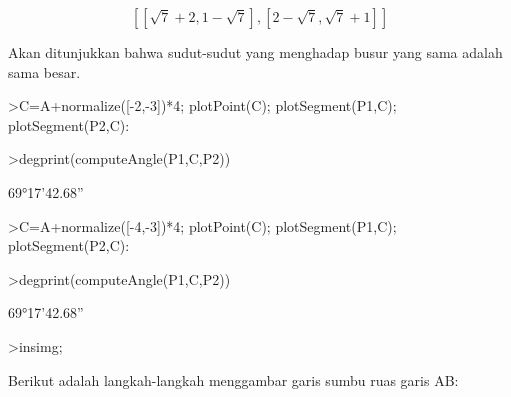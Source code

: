 \documentclass[12pt,Times new roman,letterpaper]{book}
\begin{document}
\begin{eulernootebook}
\begin{eulercomment}
\begin{eulercomment}
\begin{eulernootebook}
\begin{eulercomment}
\begin{eulercomment}
\begin{eulercomment}
\begin{eulercomment}
\begin{eulercomment}
\begin{eulercomment}
\begin{eulernotebook}
\begin{eulercomment}
\begin{euleroutput}
\end{euleroutput}
\begin{eulerformula}
\[
\left[ \left[ \sqrt{7}+2 , 1-\sqrt{7} \right]  , \left[ 2-\sqrt{7}
  , \sqrt{7}+1 \right]  \right] 
\]
\end{eulerformula}
\begin{eulercomment}
Akan ditunjukkan bahwa sudut-sudut yang menghadap busur yang sama
adalah sama besar.
\end{eulercomment}
\begin{eulerprompt}
>C=A+normalize([-2,-3])*4; plotPoint(C); plotSegment(P1,C); plotSegment(P2,C):
\end{eulerprompt}
\begin{eulerprompt}
>degprint(computeAngle(P1,C,P2))
\end{eulerprompt}
\begin{euleroutput}
  69°17'42.68''
\end{euleroutput}
\begin{eulerprompt}
>C=A+normalize([-4,-3])*4; plotPoint(C); plotSegment(P1,C); plotSegment(P2,C):
\end{eulerprompt}
\begin{eulerprompt}
>degprint(computeAngle(P1,C,P2))
\end{eulerprompt}
\begin{euleroutput}
  69°17'42.68''
\end{euleroutput}
\begin{eulerprompt}
>insimg;
\end{eulerprompt}
\begin{eulercomment}
Berikut adalah langkah-langkah menggambar garis sumbu ruas garis AB:


\end{eulercomment}
\end{eulercomment}
\end{eulernotebook}
\end{eulercomment}
\end{eulercomment}
\end{eulercomment}
\end{eulercomment}
\end{eulercomment}
\end{eulercomment}
\end{eulernootebook}
\end{eulercomment}
\end{eulercomment}
\end{eulernootebook}
\end{document}
